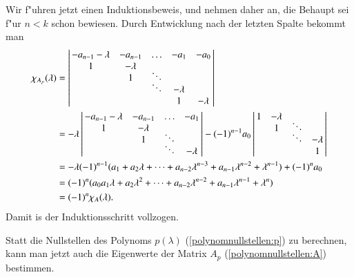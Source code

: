 Wir f"uhren jetzt einen Induktionsbeweis, und nehmen daher an, die
Behaupt sei f"ur $n < k$ schon bewiesen.
Durch Entwicklung nach der letzten Spalte bekommt man
\begin{align*}
\chi_{A_p}(\lambda)
&=
\left|\,
\begin{matrix}
-a_{n-1}-\lambda&-a_{n-1}&\dots         &    -a_1&    -a_0\\
               1&-\lambda&              &        &        \\
                &       1&\smash{\ddots}&        &        \\
                &        &\smash{\ddots}&-\lambda&        \\
                &        &              &       1&-\lambda
\end{matrix}\,\right|
\\
&=
-\lambda
\left|\,
\begin{matrix}
-a_{n-1}-\lambda&-a_{n-1}&\dots         &    -a_1\\
               1&-\lambda&              &        \\
                &       1&\smash{\ddots}&        \\
                &        &\smash{\ddots}&-\lambda
\end{matrix}
\,\right|
-
(-1)^{n-1}
a_0
\left|\,
\begin{matrix}
               1&-\lambda&              &        \\
                &       1&\smash{\ddots}&        \\
                &        &\smash{\ddots}&-\lambda\\
                &        &              &       1
\end{matrix}
\,\right|
\\
&=
-\lambda (-1)^{n-1}(
a_1+a_2\lambda+\dots+a_{n-2}\lambda^{n-3}+a_{n-1}\lambda^{n-2}+\lambda^{n-1})
+(-1)^na_0\\
&=(-1)^n(a_0
a_1\lambda+a_2\lambda^2+\dots+a_{n-2}\lambda^{n-2}+a_{n-1}\lambda^{n-1}+\lambda^n)
\\
&=(-1)^n \chi_A(\lambda).
\end{align*}
Damit is der Induktionsschritt vollzogen.

Statt die Nullstellen des Polynoms $p(\lambda)$ (\ref{polynomnullstellen:p})
zu berechnen, kann man jetzt auch die Eigenwerte der Matrix
$A_p$ (\ref{polynomnullstellen:A}) bestimmen.

